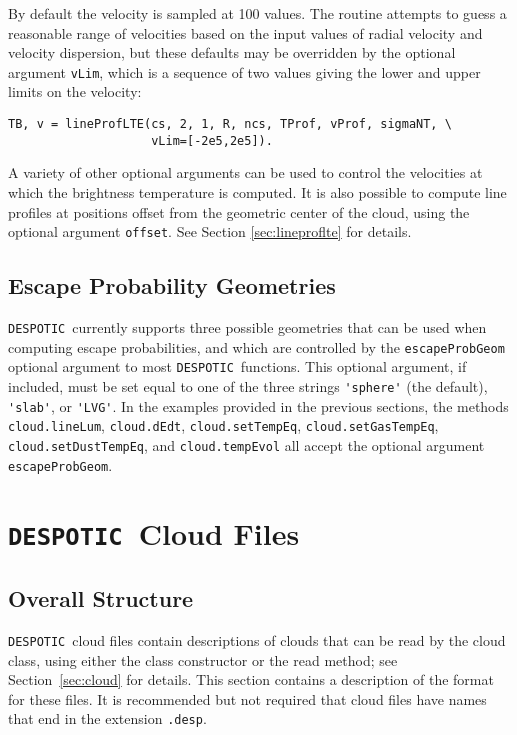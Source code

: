 \documentclass[12pt]{article}
\newcommand{\despotic}{\texttt{DESPOTIC}}
\begin{document}
By default the velocity is sampled at 100 values. The routine attempts to guess a reasonable range of velocities based on the input values of radial velocity and velocity dispersion, but these defaults may be overridden by the optional argument \verb=vLim=, which is a sequence of two values giving the lower and upper limits on the velocity:
\begin{verbatim}
TB, v = lineProfLTE(cs, 2, 1, R, ncs, TProf, vProf, sigmaNT, \
                    vLim=[-2e5,2e5]).
\end{verbatim}
A variety of other optional arguments can be used to control the velocities at which the brightness temperature is computed. It is also possible to compute line profiles at positions offset from the geometric center of the cloud, using the optional argument \verb=offset=. See Section \ref{sec:lineproflte} for details.


\subsection{Escape Probability Geometries}
\label{sec:escapeprobgeom}

\despotic\ currently supports three possible geometries that can be used when computing escape probabilities, and which are controlled by the \verb=escapeProbGeom= optional argument to most \despotic\ functions. This optional argument, if included, must be set equal to one of the three strings \verb='sphere'= (the default), \verb='slab'=, or \verb='LVG'=. In the examples provided in the previous sections, the methods \verb=cloud.lineLum=, \verb=cloud.dEdt=, \verb=cloud.setTempEq=, \verb=cloud.setGasTempEq=, \verb=cloud.setDustTempEq=, and \verb=cloud.tempEvol= all accept the optional argument \verb=escapeProbGeom=.

\clearpage

\section{\despotic\ Cloud Files}
\label{sec:cloudfiles}

\subsection{Overall Structure}

\despotic\ cloud files contain descriptions of clouds that can be read by the cloud class, using either the class constructor or the read method; see Section~\ref{sec:cloud} for details. This section contains a description of the format for these files. It is recommended but not required that cloud files have names that end in the extension \verb=.desp=.
\end{document}
